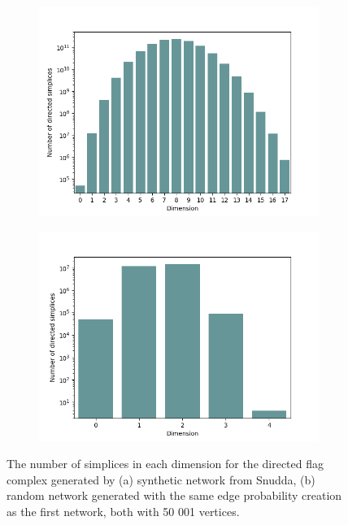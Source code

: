 \begin{figure}[ht]
  \centering
  \begin{subfigure}{.49 \linewidth}
    \includegraphics[scale=0.49]{./counts/real50k_count.png}
  \end{subfigure}%
  \begin{subfigure}{.49 \linewidth}
    \includegraphics[scale=0.49]{./counts/random50k_count.png}
  \end{subfigure}%
  \caption{\label{count50k}The number of simplices in each dimension for the directed flag complex generated by (a) synthetic network from Snudda, (b) random network generated with the same edge probability creation as the first network, both with 50 001 vertices.}
\end{figure}

